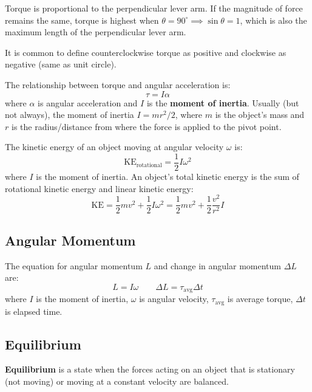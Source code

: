 \documentclass{article}
\newcommand{\definition}[1]{\begin{tcolorbox}[colback=red!5!white,colframe=red!75!black,parbox=false] #1 \end{tcolorbox}}
\newcommand{\theorem}[2]{\begin{tcolorbox}[title={#1},colback=blue!5!white,colframe=blue!75!black,parbox=false] #2 \end{tcolorbox}}
\begin{document}
Torque is proportional to the perpendicular lever arm. If the magnitude of force remains the same, torque is highest when $\theta=90^\circ\implies \sin\theta=1$, which is also the maximum length of the perpendicular lever arm.

It is common to define counterclockwise torque as positive and clockwise as negative (same as unit circle).

\theorem{Torque and angular acceleration}{The relationship between torque and angular acceleration is:
\begin{equation*}
    \tau=I\alpha
\end{equation*}
where $\alpha$ is angular acceleration and $I$ is the \textbf{moment of inertia}. Usually (but not always), the moment of inertia $I=mr^2/2$, where $m$ is the object's mass and $r$ is the radius/distance from where the force is applied to the pivot point.}

\theorem{Rotational kinetic energy}{The kinetic energy of an object moving at angular velocity $\omega$ is:
\begin{equation*}
	\text{KE}_\text{rotational}=\frac12I\omega^2
\end{equation*}
where $I$ is the moment of inertia. An object's total kinetic energy is the sum of rotational kinetic energy and linear kinetic energy:
\begin{equation*}
	\text{KE}=\frac12mv^2+\frac12I\omega^2=\frac12mv^2+\frac12 \frac{v^2}{r^2}I
\end{equation*}}

\subsection{Angular Momentum}

\theorem{Angular momentum}{The equation for angular momentum $L$ and change in angular momentum $\Delta L$ are:
\begin{equation*}
	L=I\omega \qquad
	\Delta L=\tau_\text{avg}\Delta t
\end{equation*}
where $I$ is the moment of inertia, $\omega$ is angular velocity, $\tau_\text{avg}$ is average torque, $\Delta t$ is elapsed time.}

\subsection{Equilibrium}

\definition{\textbf{Equilibrium} is a state when the forces acting on an object that is stationary (not moving) or moving at a constant velocity are balanced.}
\end{document}
